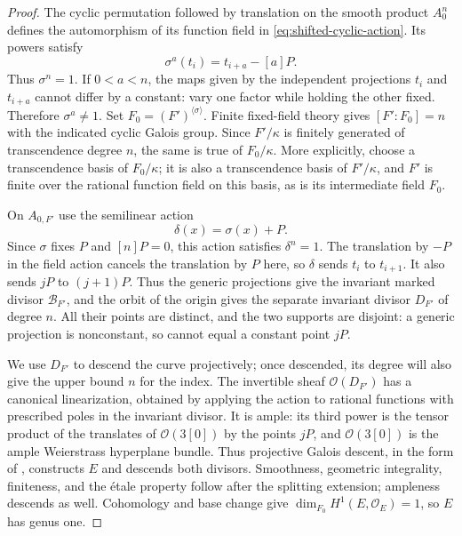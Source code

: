 \begin{proof}
The cyclic permutation followed by translation on the smooth product
$A_0^n$ defines the automorphism of its function field in
\eqref{eq:shifted-cyclic-action}.  Its powers satisfy
\[
                         \sigma^a(t_i)=t_{i+a}-[a]P.
\]
Thus $\sigma^n=1$.  If $0<a<n$, the maps given by the independent
projections $t_i$ and $t_{i+a}$ cannot differ by a constant: vary one
factor while holding the other fixed.  Therefore $\sigma^a\ne1$.
Set $F_0=(F')^{\langle\sigma\rangle}$.  Finite fixed-field theory
gives $[F':F_0]=n$ with the indicated cyclic Galois group.  Since
$F'/\kappa$ is finitely generated of transcendence degree $n$, the
same is true of $F_0/\kappa$.  More explicitly, choose a
transcendence basis of $F_0/\kappa$; it is also a transcendence basis
of $F'/\kappa$, and $F'$ is finite over the rational function field
on this basis, as is its intermediate field $F_0$.

On $A_{0,F'}$ use the semilinear action
\[
                             \delta(x)=\sigma(x)+P.
\]
Since $\sigma$ fixes $P$ and $[n]P=0$, this action satisfies
$\delta^n=1$. The translation by $-P$ in the field action cancels
the translation by $P$ here, so $\delta$ sends $t_i$ to $t_{i+1}$.
It also sends $jP$ to $(j+1)P$. Thus the generic projections give the
invariant marked divisor $\mathcal B_{F'}$, and the orbit of the
origin gives the separate invariant divisor $D_{F'}$ of degree $n$.
All their points are distinct, and the two supports are
disjoint: a generic projection is nonconstant, so cannot equal a
constant point $jP$.

We use $D_{F'}$ to descend the curve projectively; once descended,
its degree will also give the upper bound $n$ for the index.
The invertible sheaf $\mathcal O(D_{F'})$ has a canonical
linearization, obtained by applying the action to rational functions
with prescribed poles in the invariant divisor.  It is ample: its
third power is the tensor product of the translates of
$\mathcal O(3[0])$ by the points $jP$, and $\mathcal O(3[0])$ is
the ample Weierstrass hyperplane bundle.  Thus projective Galois
descent, in the form of , constructs $E$
and descends both divisors.  Smoothness, geometric integrality,
finiteness, and the \'{e}tale property follow after the splitting
extension; ampleness descends as well.  Cohomology and base change
give $\dim_{F_0}H^1(E,\mathcal O_E)=1$, so $E$ has genus one.


\end{proof}
